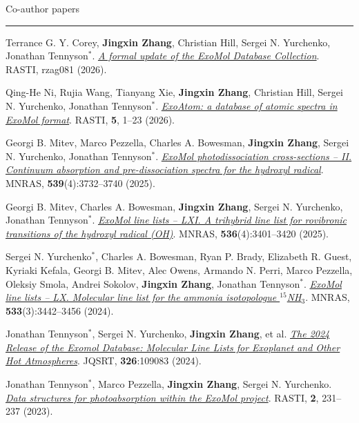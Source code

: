 \documentclass{settings} %
\renewenvironment{rSection}[1]{
\sectionskip
\textcolor{RoyalPurple}{#1}
\sectionlineskip
\hrule
\begin{list}{}{
\setlength{\leftmargin}{1.5em}
}
\item[]
}{
\end{list}
}
\begin{document}
\begin{rSection}{Co-author papers}

    \item Terrance G. Y. Corey, \textbf{Jingxin Zhang}, Christian Hill, Sergei N. Yurchenko, Jonathan Tennyson$^*$.
\href{https://doi.org/10.1093/rasti/rzag081}{\textit{A formal update of the ExoMol Database Collection}}.
RASTI, rzag081 (2026).

\item Qing-He Ni, Rujia Wang, Tianyang Xie, \textbf{Jingxin Zhang}, Christian Hill, Sergei N. Yurchenko, Jonathan Tennyson$^*$. 
\href{http://dx.doi.org/10.1093/rasti/rzaf065}{\textit{ExoAtom: a database of atomic spectra in ExoMol format}}. 
RASTI, \textbf{5}, 1--23 (2026).

\item Georgi B. Mitev, Marco Pezzella, Charles A. Bowesman, \textbf{Jingxin Zhang}, Sergei N. Yurchenko, Jonathan Tennyson$^*$. 
\href{https://doi.org/10.1093/mnras/staf729}{\textit{ExoMol photodissociation cross-sections – II. Continuum absorption and pre-dissociation spectra for the hydroxyl radical}}.
MNRAS, \textbf{539}(4):3732--3740 (2025).

\item Georgi B. Mitev, Charles A. Bowesman, \textbf{Jingxin Zhang}, Sergei N. Yurchenko, Jonathan Tennyson$^*$.
\href{https://doi.org/10.1093/mnras/stae2803}{\textit{ExoMol line lists – LXI. A trihybrid line list for rovibronic transitions of the hydroxyl radical (OH)}}.
MNRAS, \textbf{536}(4):3401--3420 (2025).

\item Sergei N. Yurchenko$^*$, Charles A. Bowesman, Ryan P. Brady, Elizabeth R. Guest, Kyriaki Kefala, Georgi B. Mitev, Alec Owens, Armando N. Perri, Marco Pezzella, Oleksiy Smola, Andrei Sokolov, \textbf{Jingxin Zhang}, Jonathan Tennyson$^*$. 
\href{https://doi.org/10.1093/mnras/stae1849}{\textit{ExoMol line lists – LX. Molecular line list for the ammonia isotopologue $^{15}$NH$_3$}}.  
MNRAS, \textbf{533}(3):3442--3456 (2024). 

\item Jonathan Tennyson$^*$, Sergei N. Yurchenko, \textbf{Jingxin Zhang}, et al.
\href{https://doi.org/10.1016/j.jqsrt.2024.109083}{\textit{The 2024 Release of the Exomol Database: Molecular Line Lists for Exoplanet and Other Hot Atmospheres}}. 
JQSRT, \textbf{326}:109083 (2024). 

\item Jonathan Tennyson$^*$, Marco Pezzella, \textbf{Jingxin Zhang}, Sergei N. Yurchenko.
\href{https://doi.org/10.1093/rasti/rzad014}{\textit{Data structures for photoabsorption within the ExoMol project}}. 
RASTI, \textbf{2}, 231--237 (2023). 

\end{rSection}
\end{document}
